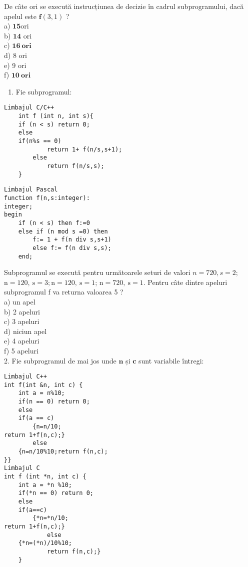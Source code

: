De câte ori se execută instrucțiunea de decizie în cadrul subprogramului, dacă apelul este $\mathbf{f}(3,1)$ ?\\
a) $\mathbf{1 5} \mathrm{ori}$\\
b) $\mathbf{1 4}$ ori\\
c) $\mathbf{1 6} \mathbf{~ o r i}$\\
d) 8 ori\\
e) 9 ori\\
f) $\mathbf{1 0} \mathbf{~ o r i}$

\begin{enumerate}
  \item Fie subprogramul:
\end{enumerate}

\begin{verbatim}
Limbajul C/C++
    int f (int n, int s){
    if (n < s) return 0;
    else
    if(n%s == 0)
            return 1+ f(n/s,s+1);
        else
            return f(n/s,s);
    }
\end{verbatim}

\begin{verbatim}
Limbajul Pascal
function f(n,s:integer):
integer;
begin
    if (n < s) then f:=0
    else if (n mod s =0) then
        f:= 1 + f(n div s,s+1)
        else f:= f(n div s,s);
    end;
\end{verbatim}

Subprogramul se execută pentru următoarele seturi de valori $n=720, s=2$; $\mathrm{n}=120, \mathrm{~s}=3 ; \mathrm{n}=120, \mathrm{~s}=1$; $\mathrm{n}=720, \mathrm{~s}=1$. Pentru câte dintre apeluri subprogramul f va returna valoarea 5 ?\\
a) un apel\\
b) 2 apeluri\\
c) 3 apeluri\\
d) niciun apel\\
e) 4 apeluri\\
f) 5 apeluri\\
2. Fie subprogramul de mai jos unde $\mathbf{n}$ și $\mathbf{c}$ sunt variabile întregi:

\begin{verbatim}
Limbajul C++
int f(int &n, int c) {
    int a = n%10;
    if(n == 0) return 0;
    else
    if(a == c)
        {n=n/10;
return 1+f(n,c);}
        else
    {n=n/10%10;return f(n,c);
}}
Limbajul C
int f (int *n, int c) {
    int a = *n %10;
    if(*n == 0) return 0;
    else
    if(a==c)
        {*n=*n/10;
return 1+f(n,c);}
            else
    {*n=(*n)/10%10;
            return f(n,c);}
    }
\end{verbatim}

